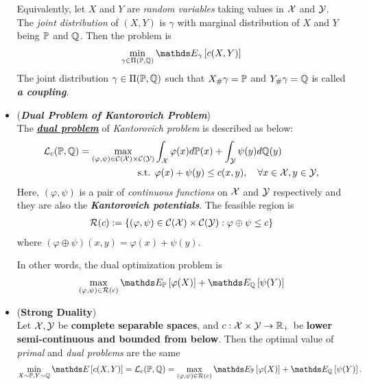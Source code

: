 \documentclass[11pt]{article}
\begin{document}
\begin{itemize}
\begin{definition}
Equivalently, let $X$ and $Y$ are \emph{random variables} taking values in ${\mathcal X}$ and ${\mathcal Y}$. The \emph{joint distribution} of $(X, Y)$ is $\gamma$ with marginal distribution of $X$ and $Y$ being ${\mathbb P}$ and ${\mathbb Q}$. Then the problem is
\begin{align*}
\min_{\gamma \in \Pi(\bP, \bQ)} \E{\gamma}{c(X, Y)}
\end{align*} The joint distribution $\gamma \in \Pi({\mathbb P}, {\mathbb Q})$ such that $X_{\#}\gamma = {\mathbb P}$ and $Y_{\#}\gamma = {\mathbb Q}$ is called \emph{\textbf{a coupling}}.
\end{definition}

\item \begin{definition} (\textbf{\emph{Dual Problem of Kantorovich Problem}}) \citep{villani2009optimal, santambrogio2015optimal, gabriel2019computational} \\
The \underline{\textbf{\emph{dual problem}}} of \emph{Kantorovich problem} is described as below:
\begin{align*}
{\mathcal L}_{c}({\mathbb P}, {\mathbb Q}) = \max_{(\varphi,  \psi) \in {\mathcal C}({\mathcal X})\times {\mathcal C}({\mathcal Y})} & \int_{{\mathcal X}}\varphi(x) d{\mathbb P}(x) + \int_{{\mathcal Y}}\psi(y) d{\mathbb Q}(y) \\
\text{s.t. }&  \varphi(x) + \psi(y) \le c(x, y),\quad \forall x\in {\mathcal X}, y \in {\mathcal Y}, 
\end{align*} Here, $(\varphi, \psi)$ is a pair of \emph{continuous functions} on ${\mathcal X}$ and ${\mathcal Y}$ respectively and they are also the \textbf{\emph{Kantorovich potentials}}. The feasible region is 
 \begin{align*}
{\mathcal R}(c) := \left\{(\varphi,  \psi) \in  {\mathcal C}({\mathcal X})\times {\mathcal C}({\mathcal Y}): \varphi \oplus \psi \le c\right\} 
\end{align*} where $( \varphi \oplus \psi)(x, y)=  \varphi(x) + \psi(y)$. 

In other words, the dual optimization problem is
\begin{align*}
\max_{(\varphi,  \psi) \in \cR(c)} \E{\bP}{\varphi(X)} + \E{\bQ}{\psi(Y)}
\end{align*}
\end{definition}

\item \begin{proposition} (\textbf{Strong Duality})  \citep{santambrogio2015optimal}\\
Let ${\mathcal X}, {\mathcal Y}$ be \textbf{complete separable spaces}, and $c: {\mathcal X} \times {\mathcal Y} \to {\mathbb R}_{+}$ be \textbf{lower semi-continuous and bounded from below}. Then the optimal value of \emph{primal} and \emph{dual problems} are the same
\begin{align*}
\min_{X \sim \bP, Y \sim \bQ} \E{}{c(X, Y)} = \cL_{c}(\bP, \bQ) = \max_{(\varphi,  \psi) \in \cR(c)} \E{\bP}{\varphi(X)} + \E{\bQ}{\psi(Y)}.
\end{align*}
\end{proposition}


\end{itemize}
\end{document}
